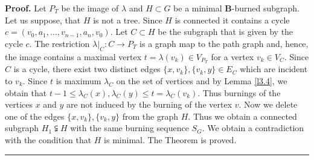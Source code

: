 \documentclass[a4paper, 11pt]{article}
\newenvironment{proof}[1][Proof]{\textbf{#1.} }{\ \rule{0.5em}{0.5em}}
\begin{document}
\begin{proof}  Let $P_T$ be the image 
of $\lambda$ and $H\subset G$ be a minimal  $\mathbf B$-burned subgraph.    
Let us suppose, that $H$ is not a tree. Since $H$ is connected it   contains a
cycle $c=(v_0, a_1, \dots , v_{n-1}, a_n, v_0)$. Let $C\subset H$ be  the subgraph that is given by the cycle $c$. The restriction 
$\lambda|_{C}\colon C\to P_T$  is a graph map to the path graph and, hence, the image contains a maximal vertex $t=\lambda(v_k)\in V_{P_T}$ for a vertex  $v_k\in V_C$.  Since $C$ is a cycle, there exist  two distinct edges 
$\{x,v_k\},\{v_k,y\}\in E_C$ which are incident to $v_k$.  Since $t$ is maximum $\lambda_C$ on the set of vertices and by Lemma \ref{l3.4}, we obtain that 
$t-1\leq \lambda_C(x), \lambda_C(y)\leq t=\lambda_C(v_k)$.  Thus  burnings of the vertices $x$ and $y$ are not induced by the burning of the vertex $v$. Now we  delete  one of the edges  $\{x,v_k\},\{v_k,y\}$  from the graph $H$. Thus   we obtain  a  connected  subgraph $H_1\subsetneqq H$ with the same burning sequence $S_G$.  We obtain a contradiction with the condition that  $H$ is minimal.  The Theorem is proved. 
\end{proof}
\end{document}
